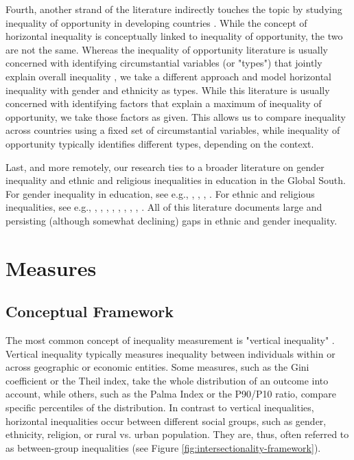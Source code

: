 Fourth, another strand of the literature indirectly touches the topic by studying inequality of opportunity in developing countries \citep{Ferreira2018, Brunori2019}. While the concept of horizontal inequality is conceptually linked to inequality of opportunity, the two are not the same. Whereas the inequality of opportunity literature is usually concerned with identifying circumstantial variables (or "types") that jointly explain overall inequality \citep[see, e.g.,][]{Brunori2021}, we take a different approach and model horizontal inequality with gender and ethnicity as types.  While this literature is usually concerned with identifying factors that explain a maximum of inequality of opportunity, we take those factors as given. This allows us to compare inequality across countries using a fixed set of circumstantial variables, while inequality of opportunity typically identifies different types, depending on the context.

Last, and more remotely, our research ties to a broader literature on gender inequality and ethnic and religious inequalities in education in the Global South. For gender inequality in education, see e.g., \cite{King1995}, \cite{Lopus2018}, \cite{Klasen2002}, \cite{Klasen2009}. For ethnic and religious inequalities, see e.g., \cite{Easterly1997}, \cite{Montalvo2003}, \cite{Montalvo2005}, \cite{Alesina2016}, \cite{Houle2017}, \cite{Muller2017}, \cite{Alcorta2018}, \cite{Cooray2011}, \cite{Hajj2009}. All of this literature documents large and persisting (although somewhat declining) gaps in ethnic and gender inequality.


\hypertarget{measures}{%
\section{Measures}\label{sec:measures}}

\hypertarget{conceptual-framework}{%
\subsection{Conceptual Framework}\label{conceptual-framework}}

The most common concept of inequality measurement is "vertical inequality" \citep{Bourguignon1979, Cowell1988, Lambert1993}. Vertical inequality typically measures inequality between individuals within or across geographic or economic entities. Some measures, such as the Gini coefficient or the Theil index, take the whole distribution of an outcome into account, while others, such as the Palma Index or the P90/P10 ratio, compare specific percentiles of the distribution. In contrast to vertical inequalities, horizontal inequalities occur between different social groups, such as gender, ethnicity, religion, or rural vs. urban population. They are, thus, often referred to as between-group inequalities (see Figure \ref{fig:intersectionality-framework}). 

